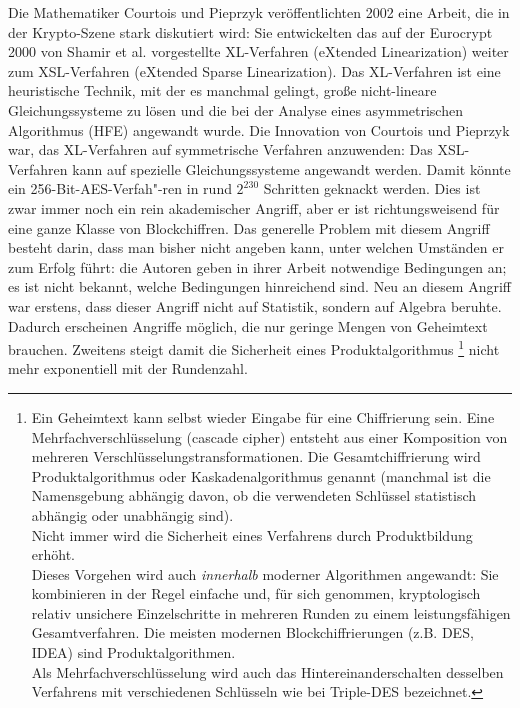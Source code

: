 \begin{refsegment}
Die Mathematiker Courtois und Pieprzyk \cite{Courtois2002} veröffentlichten
2002 eine Arbeit, die in der Krypto-Szene stark diskutiert wird: Sie
entwickelten das auf der Eurocrypt 2000 von Shamir et al. vorgestellte
XL-Verfahren (eXtended Linearization) weiter zum XSL-Verfahren
(eXtended Sparse Linearization). Das XL-Verfahren ist eine heuristische
Technik, mit der es manchmal gelingt, große nicht-lineare Gleichungssysteme
zu lösen und die bei der Analyse eines asymmetrischen Algorithmus (HFE)
angewandt wurde.  Die Innovation von Courtois und Pieprzyk war, das
XL-Verfahren auf symmetrische Verfahren anzuwenden: Das XSL-Verfahren kann
auf spezielle Gleichungssysteme angewandt werden. Damit könnte ein
256-Bit-AES-Verfah"-ren in rund $2^{230}$ Schritten geknackt werden. Dies ist
zwar immer noch ein rein akademischer Angriff, aber er ist richtungsweisend
für eine ganze Klasse von Blockchiffren. Das generelle Problem mit diesem
Angriff besteht darin, dass man bisher nicht angeben kann, unter welchen
Umständen er zum Erfolg führt: die Autoren geben in ihrer Arbeit notwendige
Bedingungen an; es ist nicht bekannt, welche Bedingungen hinreichend sind.
Neu an diesem Angriff war erstens, dass dieser Angriff nicht auf Statistik,
sondern auf Algebra beruhte. Dadurch erscheinen Angriffe möglich, die nur
geringe Mengen von Geheimtext brauchen. Zweitens steigt damit die Sicherheit
eines Produktalgorithmus%
%
\footnote{%
Ein Geheimtext kann selbst wieder Eingabe für eine Chiffrierung sein. Eine
Mehrfachverschlüsselung (cascade cipher)
entsteht aus einer Komposition von mehreren Verschlüsselungstransformationen.
Die Gesamtchiffrierung wird Produktalgorithmus oder Kaskadenalgorithmus
genannt (manchmal ist die Namensgebung abhängig davon, ob die verwendeten
Schlüssel statistisch abhängig oder unabhängig sind).\\
Nicht immer wird die Sicherheit eines Verfahrens durch Produktbildung
erhöht.\\
Dieses Vorgehen wird auch {\em innerhalb} moderner Algorithmen angewandt:
Sie kombinieren in der Regel einfache und, für sich genommen, kryptologisch
relativ unsichere Einzelschritte in mehreren Runden zu einem leistungsfähigen
Gesamtverfahren. Die meisten modernen Blockchiffrierungen (z.B. DES, IDEA)
sind Produktalgorithmen.\\
Als Mehrfachverschlüsselung wird auch das Hintereinanderschalten desselben
Verfahrens mit verschiedenen Schlüsseln wie bei Triple-DES bezeichnet.
}
nicht mehr exponentiell mit der Rundenzahl.


\end{refsegment}
